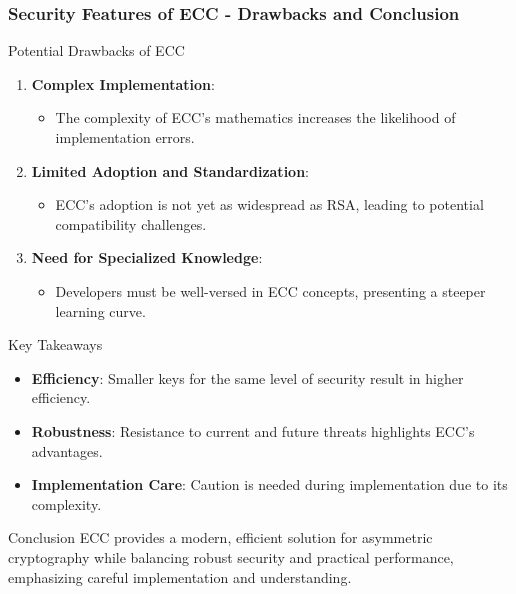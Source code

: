 \documentclass{beamer}
\begin{document}
\begin{frame}[fragile]
    \frametitle{Security Features of ECC - Drawbacks and Conclusion}
    \begin{block}{Potential Drawbacks of ECC}
        \begin{enumerate}
            \item \textbf{Complex Implementation}:
            \begin{itemize}
                \item The complexity of ECC's mathematics increases the likelihood of implementation errors.
            \end{itemize}

            \item \textbf{Limited Adoption and Standardization}:
            \begin{itemize}
                \item ECC's adoption is not yet as widespread as RSA, leading to potential compatibility challenges.
            \end{itemize}
          
            \item \textbf{Need for Specialized Knowledge}:
            \begin{itemize}
                \item Developers must be well-versed in ECC concepts, presenting a steeper learning curve.
            \end{itemize}
        \end{enumerate}
    \end{block}
    
    \begin{block}{Key Takeaways}
        \begin{itemize}
            \item \textbf{Efficiency}: Smaller keys for the same level of security result in higher efficiency.
            \item \textbf{Robustness}: Resistance to current and future threats highlights ECC's advantages.
            \item \textbf{Implementation Care}: Caution is needed during implementation due to its complexity.
        \end{itemize}
    \end{block}

    \begin{block}{Conclusion}
        ECC provides a modern, efficient solution for asymmetric cryptography while balancing robust security and practical performance, emphasizing careful implementation and understanding.
    \end{block}
\end{frame}
\end{document}
